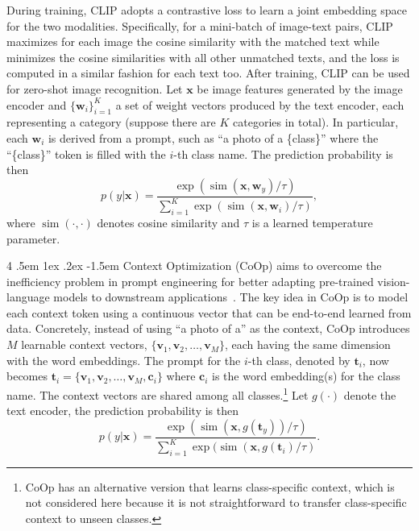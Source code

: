 \documentclass[10pt,twocolumn,letterpaper]{article}
\makeatletter
\renewcommand\paragraph{
  \@startsection{paragraph} %
  {4} %
  {\z@} %
  {.5em \@plus1ex \@minus.2ex} %
  {-1.5em} %
  {\normalfont\normalsize\bfseries} %
}
\makeatother
\begin{document}
During training, CLIP adopts a contrastive loss to learn a joint embedding space for the two modalities. Specifically, for a mini-batch of image-text pairs, CLIP maximizes for each image the cosine similarity with the matched text while minimizes the cosine similarities with all other unmatched texts, and the loss is computed in a similar fashion for each text too. After training, CLIP can be used for zero-shot image recognition. Let $\bm{x}$ be image features generated by the image encoder and $\{\bm{w}_i\}_{i=1}^K$ a set of weight vectors produced by the text encoder, each representing a category (suppose there are $K$ categories in total). In particular, each $\bm{w}_i$ is derived from a prompt, such as ``a photo of a \{class\}'' where the ``\{class\}'' token is filled with the $i$-th class name. The prediction probability is then
\begin{equation} \label{eq:pred_zs}
p(y | \bm{x}) = \frac{\exp (\operatorname{sim} (\bm{x}, \bm{w}_y) / \tau)}{\sum_{i=1}^K \exp (\operatorname{sim} (\bm{x}, \bm{w}_i) / \tau)},
\end{equation}
where $\operatorname{sim}(\cdot, \cdot)$ denotes cosine similarity and $\tau$ is a learned temperature parameter.

\paragraph{Context Optimization (CoOp)}
aims to overcome the inefficiency problem in prompt engineering for better adapting pre-trained vision-language models to downstream applications~\cite{zhou2021coop}. The key idea in CoOp is to model each context token using a continuous vector that can be end-to-end learned from data. Concretely, instead of using ``a photo of a'' as the context, CoOp introduces $M$ learnable context vectors, $\{\bm{v}_1, \bm{v}_2, \hdots, \bm{v}_M\}$, each having the same dimension with the word embeddings. The prompt for the $i$-th class, denoted by $\bm{t}_i$, now becomes $\bm{t}_i =\{\bm{v}_1, \bm{v}_2, \hdots, \bm{v}_M, \bm{c}_i\}$ where $\bm{c}_i$ is the word embedding(s) for the class name. The context vectors are shared among all classes.\footnote{CoOp has an alternative version that learns class-specific context, which is not considered here because it is not straightforward to transfer class-specific context to unseen classes.} Let $g(\cdot)$ denote the text encoder, the prediction probability is then
\begin{equation} \label{eq:pred_coop}
p(y | \bm{x}) = \frac{\exp (\operatorname{sim} (\bm{x}, g(\bm{t}_y)) / \tau)}{\sum_{i=1}^K \exp (\operatorname{sim} (\bm{x}, g(\bm{t}_i) / \tau)}.
\end{equation}
\end{document}
